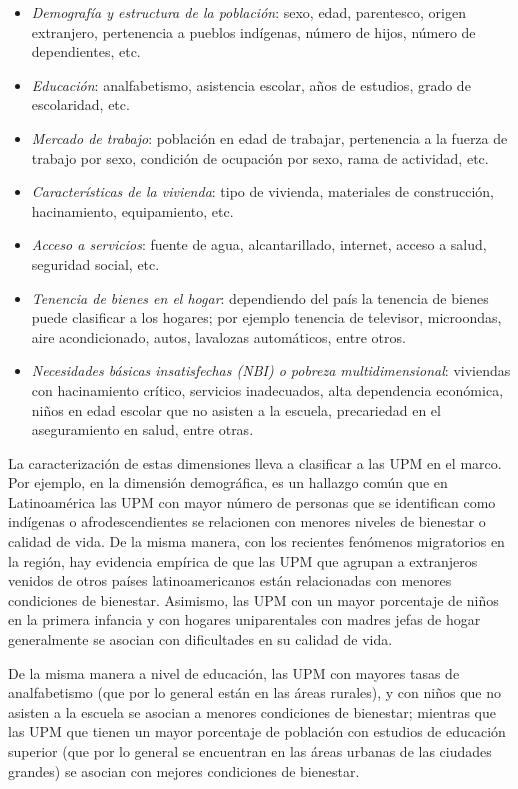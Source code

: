 \documentclass[
  12pt,
]{book}
\providecommand{\tightlist}{%
  \setlength{\itemsep}{0pt}\setlength{\parskip}{0pt}}
\begin{document}
\begin{itemize}
\tightlist
\item
  \emph{Demografía y estructura de la población}: sexo, edad, parentesco, origen extranjero, pertenencia a pueblos indígenas, número de hijos, número de dependientes, etc.
\item
  \emph{Educación}: analfabetismo, asistencia escolar, años de estudios, grado de escolaridad, etc.
\item
  \emph{Mercado de trabajo}: población en edad de trabajar, pertenencia a la fuerza de trabajo por sexo, condición de ocupación por sexo, rama de actividad, etc.
\item
  \emph{Características de la vivienda}: tipo de vivienda, materiales de construcción, hacinamiento, equipamiento, etc.
\item
  \emph{Acceso a servicios}: fuente de agua, alcantarillado, internet, acceso a salud, seguridad social, etc.
\item
  \emph{Tenencia de bienes en el hogar}: dependiendo del país la tenencia de bienes puede clasificar a los hogares; por ejemplo tenencia de televisor, microondas, aire acondicionado, autos, lavalozas automáticos, entre otros.
\item
  \emph{Necesidades básicas insatisfechas (NBI) o pobreza multidimensional}: viviendas con hacinamiento crítico, servicios inadecuados, alta dependencia económica, niños en edad escolar que no asisten a la escuela, precariedad en el aseguramiento en salud, entre otras.
\end{itemize}

La caracterización de estas dimensiones lleva a clasificar a las UPM en el marco. Por ejemplo, en la dimensión demográfica, es un hallazgo común que en Latinoamérica las UPM con mayor número de personas que se identifican como indígenas o afrodescendientes se relacionen con menores niveles de bienestar o calidad de vida. De la misma manera, con los recientes fenómenos migratorios en la región, hay evidencia empírica de que las UPM que agrupan a extranjeros venidos de otros países latinoamericanos están relacionadas con menores condiciones de bienestar. Asimismo, las UPM con un mayor porcentaje de niños en la primera infancia y con hogares uniparentales con madres jefas de hogar generalmente se asocian con dificultades en su calidad de vida.

De la misma manera a nivel de educación, las UPM con mayores tasas de analfabetismo (que por lo general están en las áreas rurales), y con niños que no asisten a la escuela se asocian a menores condiciones de bienestar; mientras que las UPM que tienen un mayor porcentaje de población con estudios de educación superior (que por lo general se encuentran en las áreas urbanas de las ciudades grandes) se asocian con mejores condiciones de bienestar.
\end{document}
